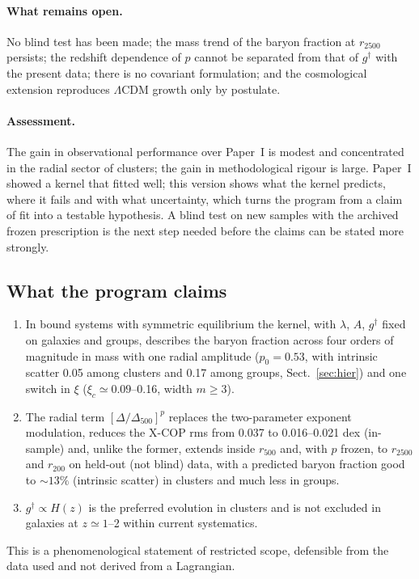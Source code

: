 \documentclass[11pt,a4paper]{article}
\newcommand{\gdag}{g^{\dagger}}
\begin{document}
\paragraph{What remains open.} No blind test has been made; the mass trend of the baryon fraction at $r_{2500}$ persists; the redshift dependence of $p$ cannot be separated from that of $\gdag$ with the present data; there is no covariant formulation; and the cosmological extension reproduces $\Lambda$CDM growth only by postulate.

\paragraph{Assessment.} The gain in observational performance over Paper~I is modest and concentrated in the radial sector of clusters; the gain in methodological rigour is large. Paper~I showed a kernel that fitted well; this version shows what the kernel predicts, where it fails and with what uncertainty, which turns the program from a claim of fit into a testable hypothesis. A blind test on new samples with the archived frozen prescription is the next step needed before the claims can be stated more strongly.

\subsection{What the program claims}
\begin{enumerate}[leftmargin=2em,itemsep=0.1em]
\item In bound systems with symmetric equilibrium the kernel, with $\lambda$, $A$, $\gdag$ fixed on galaxies and groups, describes the baryon fraction across four orders of magnitude in mass with one radial amplitude ($p_0=0.53$, with intrinsic scatter 0.05 among clusters and 0.17 among groups, Sect.~\ref{sec:hier}) and one switch in $\xi$ ($\xi_c\simeq0.09$--0.16, width $m\ge3$).
\item The radial term $[\Delta/\Delta_{500}]^p$ replaces the two-parameter exponent modulation, reduces the X-COP rms from 0.037 to 0.016--0.021 dex (in-sample) and, unlike the former, extends inside $r_{500}$ and, with $p$ frozen, to $r_{2500}$ and $r_{200}$ on held-out (not blind) data, with a predicted baryon fraction good to $\sim13\%$ (intrinsic scatter) in clusters and much less in groups.
\item $\gdag\propto H(z)$ is the preferred evolution in clusters and is not excluded in galaxies at $z\simeq1$--2 within current systematics.
\end{enumerate}
This is a phenomenological statement of restricted scope, defensible from the data used and not derived from a Lagrangian.
\end{document}
